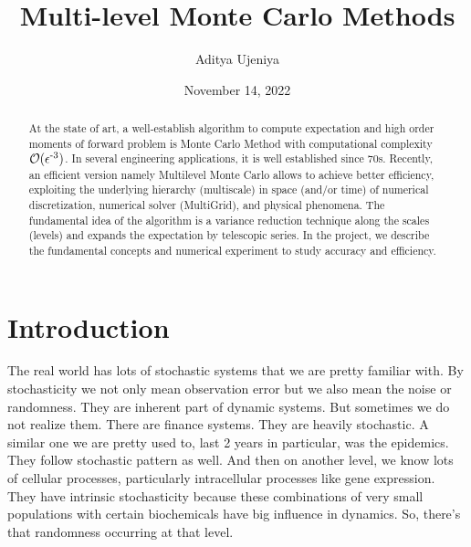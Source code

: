 \documentclass[12pt]{article}
\title{Multi-level Monte Carlo Methods}
\author{Aditya Ujeniya}
\date{November 14, 2022}
\newcommand{\ts}{\textsuperscript}
\begin{document}
\maketitle

\begin{abstract}
 At the state of art, a well-establish algorithm to compute expectation and high order moments of forward problem is Monte Carlo Method with computational complexity $\mathcal{O}(\epsilon\ts{-3})$. In several engineering applications, it is well established since 70s. Recently, an efficient version namely  Multilevel Monte Carlo allows to achieve better efficiency, exploiting the underlying hierarchy (multiscale) in space (and/or time) of numerical discretization, numerical solver (MultiGrid), and physical phenomena.  The fundamental idea of the algorithm is a variance reduction technique along the scales (levels) and expands the expectation by telescopic series. In the project, we describe the fundamental concepts and numerical experiment to study accuracy and efficiency. 
 
\end{abstract}

\section{Introduction}

The real world has lots of stochastic systems that we are pretty familiar with. By stochasticity we not only mean observation error but we also mean the noise or randomness. They are inherent part of dynamic systems. But sometimes we do not realize them. There are finance systems. They are heavily stochastic. A similar one we are pretty used to, last 2 years in particular, was the epidemics. They follow stochastic pattern as well. And then on another level, we know lots of cellular processes, particularly intracellular processes like gene expression. They have intrinsic stochasticity because these combinations of very small populations with certain biochemicals have big influence in dynamics. So, there's that randomness occurring at that level.
\end{document}
